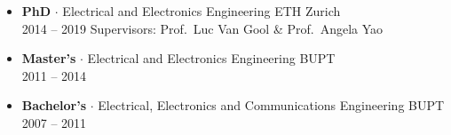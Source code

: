 \documentclass[10pt, letterpaper]{article}
\begin{document}
\begin{itemize}[leftmargin=0pt, itemsep=3pt, parsep=0pt, topsep=1pt, label={}]

  \item {\small\textbf{PhD} $\cdot$ Electrical and Electronics Engineering \quad ETH Zurich}\\
    {\footnotesize\color{midgray}
      2014 -- 2019 \quad
      Supervisors: Prof.\ Luc Van Gool \& Prof.\ Angela Yao}

  \item {\small\textbf{Master's} $\cdot$ Electrical and Electronics Engineering \quad BUPT}\\
    {\footnotesize\color{midgray} 2011 -- 2014}

  \item {\small\textbf{Bachelor's} $\cdot$ Electrical, Electronics and Communications Engineering \quad BUPT}\\
    {\footnotesize\color{midgray} 2007 -- 2011}

\end{itemize}
\end{document}

